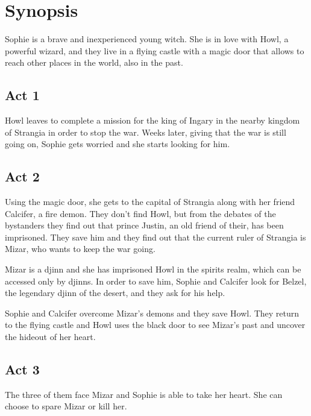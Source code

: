 \section{Synopsis}

Sophie is a brave and inexperienced young witch. She is in love with Howl, a powerful wizard, and they live in a flying castle with a magic door that allows to reach other places in the world, also in the past.

\subsection*{Act 1}

Howl leaves to complete a mission for the king of Ingary in the nearby kingdom of Strangia in order to stop the war. Weeks later, giving that the war is still going on, Sophie gets worried and she starts looking for him.

\subsection*{Act 2}

Using the magic door, she gets to the capital of Strangia along with her friend Calcifer, a fire demon. They don’t find Howl, but from the debates of the bystanders they find out that prince Justin, an old friend of their, has been imprisoned. They save him and they find out that the current ruler of Strangia is Mizar, who wants to keep the war going.

Mizar is a djinn and she has imprisoned Howl in the spirits realm, which can be accessed only by djinns. In order to save him, Sophie and Calcifer look for Belzel, the legendary djinn of the desert, and they ask for his help.

Sophie and Calcifer overcome Mizar's demons and they save Howl. They return to the flying castle and Howl uses the black door to see Mizar's past and uncover the hideout of her heart.

\subsection*{Act 3}

The three of them face Mizar and Sophie is able to take her heart. She can choose to spare Mizar or kill her.
